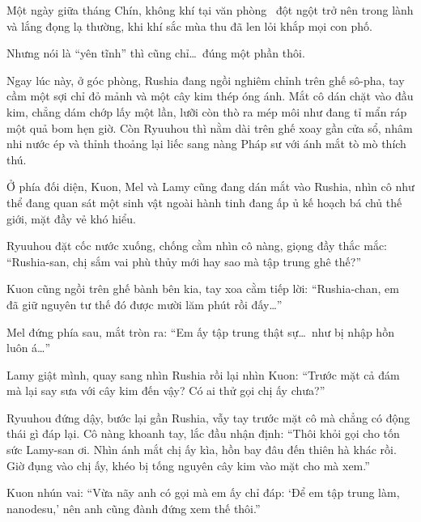 \documentclass[../main.tex]{subfiles}
\begin{document}

Một ngày giữa tháng Chín, không khí tại văn phòng \hll\ đột ngột trở nên trong lành và lắng đọng lạ thường, khi khí sắc mùa thu đã len lỏi khắp mọi con phố.

Nhưng nói là ``yên tĩnh'' thì cũng chỉ\dots\ đúng một phần thôi.

Ngay lúc này, ở góc phòng, Rushia đang ngồi nghiêm chỉnh trên ghế sô-pha, tay cầm một sợi chỉ đỏ mảnh và một cây kim thép óng ánh. Mắt cô dán chặt vào đầu kim, chẳng dám chớp lấy một lần, lưỡi còn thò ra mép môi như đang tỉ mẩn ráp một quả bom hẹn giờ. Còn Ryuuhou thì nằm dài trên ghế xoay gần cửa sổ, nhâm nhi nước ép và thỉnh thoảng lại liếc sang nàng Pháp sư với ánh mắt tò mò thích thú.

Ở phía đối diện, Kuon, Mel và Lamy cũng đang dán mắt vào Rushia, nhìn cô như thể đang quan sát một sinh vật ngoài hành tinh đang ấp ủ kế hoạch bá chủ thế giới, mặt đầy vẻ khó hiểu.

Ryuuhou đặt cốc nước xuống, chống cằm nhìn cô nàng, giọng đầy thắc mắc: ``Rushia-san, chị sắm vai phù thủy mới hay sao mà tập trung ghê thế?''

Kuon cũng ngồi trên ghế bành bên kia, tay xoa cằm tiếp lời: ``Rushia-chan, em đã giữ nguyên tư thế đó được mười lăm phút rồi đấy\dots''

Mel đứng phía sau, mắt tròn ra: ``Em ấy tập trung thật sự\dots\ như bị nhập hồn luôn á\dots''

Lamy giật mình, quay sang nhìn Rushia rồi lại nhìn Kuon: ``Trước mặt cả đám mà lại say sưa với cây kim đến vậy? Có ai thử gọi chị ấy chưa?''

Ryuuhou đứng dậy, bước lại gần Rushia, vẫy tay trước mặt cô mà chẳng có động thái gì đáp lại. Cô nàng khoanh tay, lắc đầu nhận định: ``Thôi khỏi gọi cho tốn sức Lamy-san ơi. Nhìn ánh mắt chị ấy kìa, hồn bay đâu đến thiên hà khác rồi. Giờ đụng vào chị ấy, khéo bị tống nguyên cây kim vào mặt cho mà xem.''

Kuon nhún vai: ``Vừa nãy anh có gọi mà em ấy chỉ đáp: `Để em tập trung làm, nanodesu,' nên anh cũng đành đứng xem thế thôi.''
\end{document}

